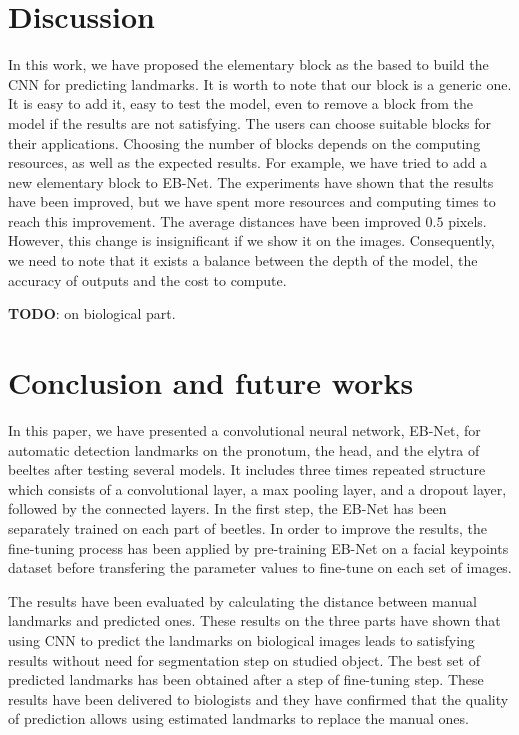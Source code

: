 \documentclass[review]{elsarticle}
\begin{document}
\section{Discussion}
In this work, we have proposed the elementary block as the based to build the CNN for predicting landmarks. It is worth to note that our block is a generic one. It is easy to add it, easy to test the model, even to remove a block from the model if the results are not satisfying. The users can choose suitable blocks for their applications. Choosing the number of blocks depends on the computing resources, as well as the expected results. For example, we have tried to add a new elementary block to EB-Net. The experiments have shown that the results have been improved, but we have spent more resources and computing times to reach this improvement. The average distances have been improved $0.5$ pixels. However, this change is insignificant if we show it on the images. Consequently, we need to note that it exists a balance between the depth of the model, the accuracy of outputs and the cost to compute.

\textbf{TODO}: on biological part.

\section{Conclusion and future works}
In this paper, we have presented a convolutional neural network, EB-Net, for automatic detection landmarks on the pronotum, the head, and the elytra of beeltes after testing several models. It includes three times repeated structure which consists of a convolutional layer, a max pooling layer, and a dropout layer, followed by the connected layers. In the first step, the EB-Net has been separately trained on each part of beetles. In order to improve the results, the fine-tuning process has been applied by pre-training EB-Net on a facial keypoints dataset before transfering the parameter values to fine-tune on each set of images.

The results have been evaluated by calculating the distance between manual landmarks and predicted ones. These results on the three parts have shown that using CNN to predict the landmarks on biological images leads to satisfying results without need for segmentation step on studied object. The best set of predicted landmarks has been obtained after a step of fine-tuning step. These results have been delivered to biologists and they have confirmed that the quality of prediction allows using estimated landmarks to replace the manual ones.
\end{document}
